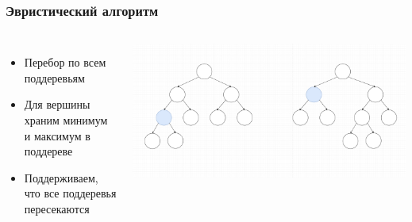 \documentclass{beamer}
\begin{document}
\begin{frame}
    \frametitle{Эвристический алгоритм}
    \begin{columns}
            \begin{itemize}
                    \item Перебор по всем поддеревьям
                    \item Для вершины храним минимум и максимум в поддереве
                    \item Поддерживаем, что все поддеревья пересекаются
            \end{itemize}
            \includegraphics[width=\textwidth]{tree.png}
    \end{columns}
\end{frame}
\end{document}
